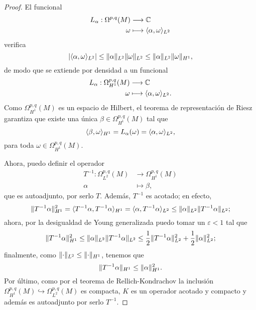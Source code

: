 \documentclass[12pt,a4paper]{article}
\theoremstyle{definition} \newtheorem{defn}[thm]{Definición}
\theoremstyle{definition} \newtheorem{ejemplo}[thm]{Ejemplo}
\theoremstyle{definition} \newtheorem{ejercicio}[thm]{Ejercicio}
\theoremstyle{remark} \newtheorem*{obs}{Observación}
\DeclarePairedDelimiter\norm{\lVert}{\rVert}
\DeclarePairedDelimiter\esc{\langle}{\rangle}
\newcommand{\CC}{\mathbb{C}}
\newcommand{\eps}{\varepsilon}
\begin{document}
    \begin{proof}
 El funcional
 \begin{align*}
   L_\alpha :\Omega^{p,q}(M)&\longrightarrow \CC\\ 
   \omega &\longmapsto \esc{\alpha,\omega}_{L^2} 
   \end{align*}
   verifica
   \begin{equation*}
     |\esc{\alpha,\omega}_{L^2}|\leq \norm{\alpha}_{L^2}\norm{\omega}_{L^2} \leq \norm{\alpha}_{L^2} \norm{\omega}_{H^1},
   \end{equation*}
   de modo que se extiende por densidad a un funcional
 \begin{align*}
   L_\alpha :\Omega_{H^1}^{p,q}(M)&\longrightarrow \CC\\ 
   \omega &\longmapsto \esc{\alpha,\omega}_{L^2} .
   \end{align*}
   Como $\Omega_{H^1}^{p,q}(M)$ es un espacio de Hilbert, el teorema de representación de Riesz garantiza que existe una única $\beta \in \Omega^{p,q}_{H^1}(M)$ tal que 
   \begin{equation*}
     \esc{\beta,\omega}_{H^1} = L_\alpha(\omega)=\esc{\alpha,\omega}_{L^2},
   \end{equation*}
   para toda $\omega \in \Omega^{p,q}_{H^1}(M)$. 

   Ahora, puedo definir el operador
   \begin{align*}
     T^{-1} :\Omega^{p,q}_{L^2}(M)&\longrightarrow \Omega^{p,q}_{H^1}(M)\\ 
       \alpha &\longmapsto \beta, 
     \end{align*}
     que es autoadjunto, por serlo $T$. Además, $T^{-1}$ es acotado; en efecto,
     \begin{equation*}
       \norm{T^{-1}\alpha}_{H^1}^2=\esc{T^{-1}\alpha,T^{-1}\alpha}_{H^1}=\esc{\alpha,T^{-1}\alpha}_{L^2} \leq \norm{\alpha}_{L^2} \norm{T^{-1}\alpha}_{L^2};
     \end{equation*}
ahora, por la desigualdad de Young generalizada puedo tomar un $\eps <1$ tal que
     \begin{equation*}
       \norm{T^{-1}\alpha}_{H^1}^2\leq \norm{\alpha}_{L^2} \norm{T^{-1}\alpha}_{L^2}
       \leq \frac{1}{2} \norm{T^{-1}\alpha}^2_{L^2} + \frac{1}{2}\norm{\alpha}^2_{L^2} ;
     \end{equation*}
     finalmente, como $\norm{\cdot}_{L^2} \leq \norm{\cdot}_{H^1}$, tenemos que
     \begin{equation*}
       \norm{T^{-1}\alpha}_{H^1} \leq \norm{\alpha}^2_{H^1}.
     \end{equation*}
     Por último, como por el teorema de Rellich-Kondrachov la inclusión $\Omega^{p,q}_{H^1}(M) \hookrightarrow \Omega^{p,q}_{L^2}(M)$ es compacta, $K$ es un operador acotado y compacto y además es autoadjunto por serlo $T^{-1}$.
    \end{proof}
\end{document}
